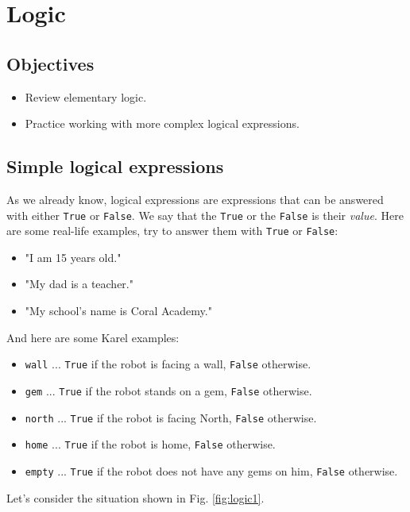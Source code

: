 
\section{Logic} \label{sec:logic} 

\subsection[\ \ Objectives]{Objectives} 
 
\begin{itemize}
\item Review elementary logic.
\item Practice working with more complex logical expressions.
\end{itemize}

\subsection[\ \ Simple logical expressions]{Simple logical expressions}

As we already know, logical expressions are expressions that can be answered with either {\tt True} or 
{\tt False}. We say that the {\tt True} or the {\tt False} is their {\em value}. Here are some 
real-life examples, try to answer them with {\tt True} or {\tt False}:

\begin{itemize}
\item "I am 15 years old."
\item "My dad is a teacher."
\item "My school's name is Coral Academy."
\end{itemize}
And here are some Karel examples:
\begin{itemize}
\item {\color{ForestGreen} \tt wall} ... {\tt True} if the robot is facing a wall, {\tt False} otherwise.
\item {\color{ForestGreen} \tt gem}  ... {\tt True} if the robot stands on a gem, {\tt False} otherwise.
\item {\color{ForestGreen} \tt north} ... {\tt True} if the robot is facing North, {\tt False} otherwise.
\item {\color{ForestGreen} \tt home} ... {\tt True} if the robot is home, {\tt False} otherwise.
\item {\color{ForestGreen} \tt empty} ... {\tt True} if the robot does not have any gems on him, {\tt False} otherwise.
\end{itemize}
Let's consider the situation shown in Fig. \ref{fig:logic1}.

